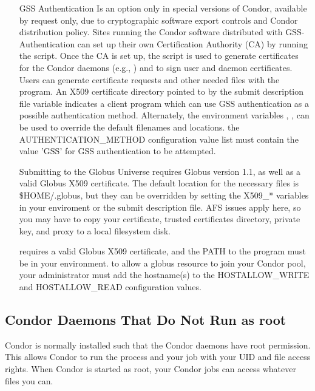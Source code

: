 \begin{enumerate}
\item[GSS Authentication] Is an option only in special versions of Condor,
available by request only, due to cryptographic software export controls
and Condor distribution policy.
Sites running the Condor software distributed with GSS-Authentication can 
set up their own Certification Authority (CA) by running the 
 script. 
Once the CA is set up, the  script is used to generate 
certificates for the Condor daemons (e.g., ) and to sign
user and daemon certificates. Users can generate certificate requests
and other needed files with the  program.
An X509 certificate directory pointed to by the submit description file 
variable  indicates a client program which can use GSS
authentication as a possible authentication method. Alternately, the
environment variables , ,
 can be used to override the default filenames and 
locations.
\Note the AUTHENTICATION\_METHOD configuration value list must contain 
the value 'GSS' for GSS authentication to be attempted.

\item[Submitting to the Globus Universe] 
requires Globus version 1.1, as well as a valid Globus X509 certificate. 
The default location for the necessary files is \$HOME/.globus, but they 
can be overridden by setting the X509\_* variables in your enviroment 
or the submit description file.
\Note AFS issues apply here, so you may have to copy your certificate,
trusted certificates directory, private key, and proxy to a local
filesystem disk.

\item[\Condor{glidein}]  requires a valid 
Globus X509 certificate, and the PATH to the  program 
must be in your environment.
\Note to allow a globus resource to join your Condor pool, your 
administrator must add the hostname(s) to the HOSTALLOW\_WRITE and
HOSTALLOW\_READ configuration values.
\end{enumerate}

\subsection{Condor Daemons That Do Not Run as root}

Condor is normally installed such that the Condor daemons have root
permission.
This allows Condor to run the  
process and
your job with your UID and file access rights.
When Condor
is started as root, your Condor jobs can access whatever files you can.


